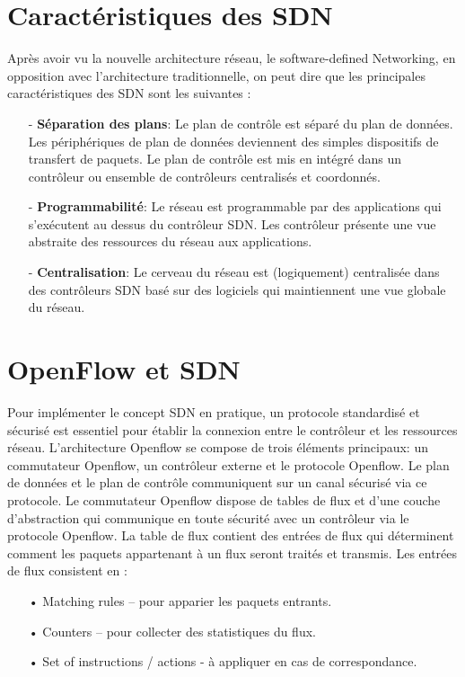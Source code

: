 \section{Caractéristiques des SDN}
Après avoir vu la nouvelle architecture réseau, le software-defined Networking, en opposition avec l'architecture traditionnelle, on peut dire que les principales caractéristiques des SDN sont les suivantes :\\
\begin{itemize}
\item[-]\textbf{Séparation des plans}: Le plan de contrôle est séparé du plan de données. Les périphériques de plan de données deviennent des simples dispositifs de transfert de paquets. Le plan de contrôle est mis en intégré dans un contrôleur ou ensemble de contrôleurs centralisés et coordonnés.
\item[-]\textbf{Programmabilité}: Le réseau est programmable par des applications qui s’exécutent au dessus du contrôleur SDN. Les contrôleur présente une vue abstraite des ressources du réseau aux applications.
\item[-]\textbf{Centralisation}: Le cerveau du réseau est (logiquement) centralisée dans des contrôleurs SDN basé sur des logiciels qui maintiennent une vue globale du réseau.
\end{itemize}

\section{OpenFlow et SDN}
\label{S_OpenFlow}
Pour implémenter le concept SDN en pratique, un protocole standardisé et sécurisé est essentiel  pour établir la connexion entre le contrôleur et les ressources réseau. L’architecture Openflow se compose de trois éléments principaux: un commutateur Openflow, un contrôleur externe et le protocole Openflow. Le plan de données et le plan de contrôle communiquent sur un canal sécurisé via ce protocole. Le commutateur Openflow dispose de tables de flux et d’une couche d’abstraction qui communique en toute sécurité avec un contrôleur via le protocole Openflow. La table de flux contient des entrées de flux qui déterminent comment les paquets appartenant à un flux seront traités et transmis. 
Les entrées de flux consistent en :\\

\begin{itemize}
\item[•] Matching rules – pour apparier les paquets entrants.
\item[•] Counters – pour collecter des statistiques du flux.
\item[•] Set of instructions / actions - à appliquer en cas de correspondance.\\
\end{itemize}

